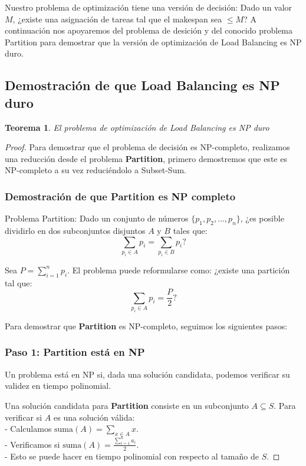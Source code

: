 \documentclass{report}
\newtheorem{theorem}{Teorema} %
\begin{document}
	Nuestro problema de optimización tiene una versión de decisión: Dado un valor $ M $, ¿existe una asignación de tareas tal que el makespan sea $ \leq M $?
	A continuación nos apoyaremos del problema de desición y del conocido problema Partition para demostrar que la versión de optimización de Load Balancing es NP duro.
	
	\subsection{Demostración de que Load Balancing es NP duro}
	
	\begin{theorem}
		El problema de optimización de Load Balancing es NP duro
	\end{theorem}
	
	\begin{proof}
		
	Para demostrar que el problema de decisión es NP-completo, realizamos una reducción desde el problema \textbf{Partition}, primero demostremos que este es NP-completo a su vez reduciéndolo a Subset-Sum.
	
	\subsubsection{Demostración de que Partition es NP completo}
	
	Problema Partition:	Dado un conjunto de números $ \{p_1, p_2, \dots, p_n\} $, ¿es posible dividirlo en dos subconjuntos disjuntos $ A $ y $ B $ tales que:
	\[
	\sum_{p_i \in A} p_i = \sum_{p_i \in B} p_i?
	\]
	
	Sea $ P = \sum_{i=1}^n p_i $. El problema puede reformularse como: ¿existe una partición tal que:
	\[
	\sum_{p_i \in A} p_i = \frac{P}{2}?
	\]
	
	
	Para demostrar que \textbf{Partition} es NP-completo, seguimos los siguientes pasos:
	
	\subsubsection*{Paso 1: Partition está en NP}
	
	Un problema está en NP si, dada una solución candidata, podemos verificar su validez en tiempo polinomial.
	
	Una solución candidata para \textbf{Partition} consiste en un subconjunto $ A \subseteq S $. Para verificar si $ A $ es una solución válida:\\
	- Calculamos $ \text{suma}(A) = \sum_{x \in A} x $.\\
	- Verificamos si $ \text{suma}(A) = \frac{\sum_{i=1}^n a_i}{2} $.\\
	- Esto se puede hacer en tiempo polinomial con respecto al tamaño de $ S $.
	

\end{proof}
\end{document}
